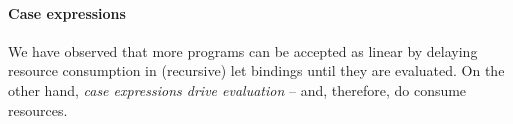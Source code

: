 \documentclass[acmsmall,review,anonymous,screen]{acmart}
\newcommand{\parawith}[1]{\paragraph{\emph{#1}}}
\begin{document}

\paragraph{Case expressions}
We have observed that more programs can be accepted as linear by delaying
resource consumption in (recursive) let bindings until they are evaluated.
On the other hand, \emph{case expressions drive evaluation} -- and, therefore,
do consume resources.



\end{document}
